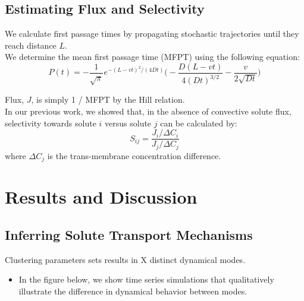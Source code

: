 \documentclass{article}
\begin{document}
  \subsection{Estimating Flux and Selectivity}
  
  \noindent We calculate first passage times by propagating stochastic trajectories until they
  reach distance $L$. \\
  
  We determine the mean first passage time (MFPT) using the following equation:~\cite{cussler_diffusion:_2009}
  \begin{equation}
  P(t) = -\frac{1}{\sqrt{\pi}}e^{-(L - vt)^2 / (4Dt)}\bigg(-\frac{D(L - vt)}{4(Dt)^{3/2}} - \frac{v}{2\sqrt{Dt}}\bigg)
  \label{eqn:passage_times}
  \end{equation}
  
  \noindent Flux, $J$, is simply 1 / MFPT by the Hill relation.~\cite{hill_free_1989} \\
  
  In our previous work, we showed that, in the absence of convective solute flux, selectivity
  towards solute $i$ versus solute $j$ can be calculated by:  
  \begin{equation}
  S_{ij} = \frac{J_i / \Delta C_i}{J_j / \Delta C_j}
  \label{eqn:selectivity}
  \end{equation}
  where $\Delta C_j$ is the trans-membrane concentration difference.

  \section{Results and Discussion}
  \subsection{Inferring Solute Transport Mechanisms}
  
  Clustering parameters sets results in X distinct dynamical modes.
  \begin{itemize}
    \item In the figure below, we show time series simulations that qualitatively
    illustrate the difference in dynamical behavior between modes.
  \end{itemize}
   
\end{document}
